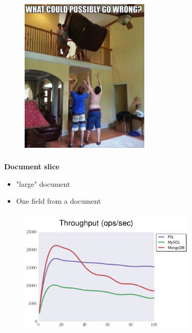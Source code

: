 \documentclass[usenames,dvipsnames, 18pt, compress, aspectratio=169]{beamer}
\begin{document}
\begin{frame}
    \frametitle{}
    \begin{center}
    \begin{figure}
        \includegraphics[width=0.55\textwidth,center]{wrong.jpg}
    \end{figure}
    \end{center}
\end{frame}

\begin{frame}
    \frametitle{}
    \begin{center}
        \textbf{Document slice}
        \begin{itemize}[label={}]
            \item "large" document
            \item One field from a document
        \end{itemize}
    \end{center}
\end{frame}

\begin{frame}
    \frametitle{}
    \begin{center}
    \begin{figure}
        \includegraphics[width=0.75\textwidth,center]{benchmarks/select_slice_1_btree_throughput.png}
    \end{figure}
    \end{center}
\end{frame}
\end{document}
